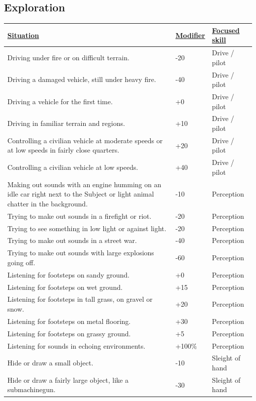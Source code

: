 \subsection{Exploration}
\begin{tabularx}{\textwidth}{|X|l|l|}
	\hline
	\ul{Situation} & \ul{Modifier} & \ul{Focused skill} \\ \hline
	Driving under fire or on difficult terrain. & -20 & Drive / pilot \\ \hline
	Driving a damaged vehicle, still under heavy fire. & -40 & Drive / pilot \\ \hline
	Driving a vehicle for the first time. & +0 & Drive / pilot \\ \hline
	Driving in familiar terrain and regions. & +10 & Drive / pilot \\ \hline
	Controlling a civilian vehicle at moderate speeds or at low speeds in fairly close quarters. & +20 & Drive / pilot \\ \hline
	Controlling a civilian vehicle at low speeds. & +40 & Drive / pilot \\ \hline
	Making out sounds with an engine humming on an idle car right next to the Subject or light animal chatter in the background. & -10 & Perception \\ \hline
	Trying to make out sounds in a firefight or riot. & -20 & Perception \\ \hline
	Trying to see something in low light or against light. & -20 & Perception \\ \hline
	Trying to make out sounds in a street war. & -40 & Perception \\ \hline
	Trying to make out sounds with large explosions going off. & -60 & Perception \\ \hline
	Listening for footsteps on sandy ground. & +0 & Perception \\ \hline
	Listening for footsteps on wet ground. & +15 & Perception \\ \hline
	Listening for footsteps in tall grass, on gravel or snow. & +20 & Perception \\ \hline
	Listening for footsteps on metal flooring. & +30 & Perception \\ \hline
	Listening for footsteps on grassy ground. & +5 & Perception \\ \hline
	Listening for sounds in echoing environments. & +100\% & Perception \\ \hline
	Hide or draw a small object. & -10 & Sleight of hand \\ \hline
	Hide or draw a fairly large object, like a submachinegun. & -30 & Sleight of hand \\ \hline
\end{tabularx}

